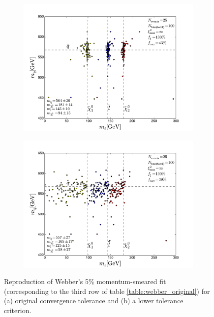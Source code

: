 \documentclass[twoside,english]{uiofysmaster}
\begin{document}
\begin{figure}[hbt]
	\centering
	\begin{subfigure}[b]{0.6\textwidth}
		\includegraphics[width=\textwidth]{figures/webber_rec_table/webber_HW-rec_OFL_minuit-minimizer_hightol_5pmomsmear_nocut.pdf} 
		\caption{ }
	\end{subfigure}

	\begin{subfigure}[b]{0.6\textwidth}
		\includegraphics[width=\textwidth]{figures/webber_rec_table/webber_HW-rec_OFL_minuit-minimizer_lowtol_5pmomsmear_nocut.pdf}
		\caption{ } 
	\end{subfigure}
	\caption{Reproduction of Webber's 5\% momentum-smeared fit (corresponding to the third row of table \ref{table:webber_original}) for (a) original convergence tolerance and (b) a lower tolerance criterion.}
	\label{fig:webber_rec_scatter_tolerance-comparison_5pmomsmear}
\end{figure}
\end{document}
